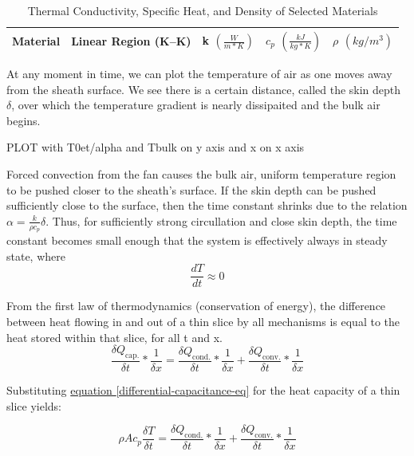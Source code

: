 \documentclass[10pt, twocolumn]{article}
\begin{document}
\begin{table}
\centering
\caption{Thermal Conductivity, Specific Heat, and Density of Selected Materials}
\begin{tabular}{c | c | c | c | c}
\hline\hline
Material	&Linear Region (K--K)	&k \(\left(\frac{W}{m*K}\right)\)	&\(c_{p}\) \(\left(\frac{kJ}{kg*K}\right)\)	&\(\rho\) \((kg/m^{3})\)	\\
\hline\hline

\hline\hline
\end{tabular}
\label{thermal-properties-table}
\end{table}

At any moment in time, we can plot the temperature of air as one
moves away from the sheath surface. We see there is a certain
distance, called the skin depth $\delta$, over which the temperature
gradient is nearly dissipaited and the bulk air begins.

PLOT with T0et/alpha and Tbulk on y axis and x on x axis

Forced convection from the fan causes the bulk air, uniform temperature
region to be pushed closer to the sheath's surface.
If the skin depth can be pushed sufficiently close to the surface,
then the time constant shrinks due to the relation $\alpha=\frac{k}{\rho c_{p}}\delta$.
Thus, for sufficiently strong circullation and close skin depth, the time
constant becomes small enough that the system is effectively always in
steady state, where
\begin{equation*}
\frac{dT}{dt}\approx 0
\end{equation*}

From the first law of thermodynamics (conservation of energy),
the difference between heat flowing in and out of a thin slice by
all mechanisms is equal to the heat stored within that slice, for all t and x.
\begin{equation*}
\frac{\delta Q_{\textrm{cap.}}}{\delta t}*\frac{1}{\delta x}=
\frac{\delta Q_{\textrm{cond.}}}{\delta t}*\frac{1}{\delta x}+
\frac{\delta Q_{\textrm{conv.}}}{\delta t}*\frac{1}{\delta x}
\end{equation*}

Substituting
\hyperref[differential-capacitance-eq]{equation \ref{differential-capacitance-eq}}
for the heat capacity of a thin slice yields:

\begin{equation*}
\rho A c_{p}\frac{\delta T}{\delta t}=
\frac{\delta Q_{\textrm{cond.}}}{\delta t}*\frac{1}{\delta x}+
\frac{\delta Q_{\textrm{conv.}}}{\delta t}*\frac{1}{\delta x}
\end{equation*}
\end{document}
